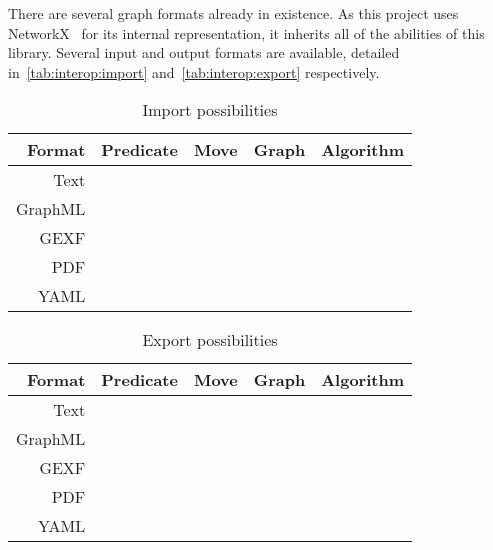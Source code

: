 There are several graph formats already in existence.
As this project uses NetworkX~\autocite{hagberg:networkx} for its internal representation,
  it inherits all of the abilities of this library.
Several input and output formats are available,
  detailed in~\autoref{tab:interop:import} and~\autoref{tab:interop:export} respectively.
\begin{table}
  \centering
  \providecommand\yes{\ding{51}}
  \providecommand\no{\ding{55}}
  \begin{tabular}{rcccc}
    \toprule
    Format  & Predicate & Move & Graph & Algorithm \\
    \midrule
    Text    & \yes      & \yes & \yes  & \yes      \\
    GraphML & \no       & \no  & \yes  & \no       \\
    GEXF    & \no       & \no  & \yes  & \no       \\
    PDF     & \yes      & \yes & \yes  & \yes      \\
    YAML    & \yes      & \yes & \yes  & \yes      \\
    \bottomrule
  \end{tabular}
  \caption{Import possibilities}
  \label{tab:interop:import}
\end{table}
\begin{table}
  \centering
  \providecommand\yes{\ding{51}}
  \providecommand\no{\ding{55}}
  \begin{tabular}{rcccc}
    \toprule
    Format  & Predicate & Move & Graph & Algorithm \\
    \midrule
    Text    & \yes      & \yes & \yes  & \yes      \\
    GraphML & \no       & \no  & \yes  & \no       \\
    GEXF    & \no       & \no  & \yes  & \no       \\
    PDF     & \yes      & \yes & \yes  & \yes      \\
    YAML    & \yes      & \yes & \yes  & \yes      \\
    \bottomrule
  \end{tabular}
  \caption{Export possibilities}
  \label{tab:interop:export}
\end{table}

